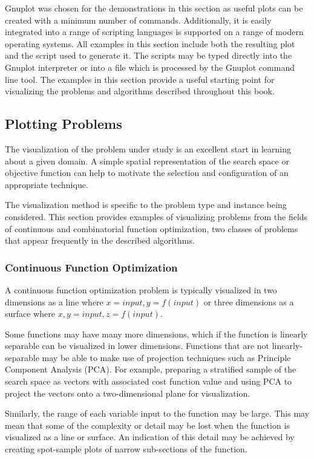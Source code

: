 Gnuplot was chosen for the demonstrations in this section as useful plots can be created with a minimum number of commands. Additionally, it is easily integrated into a range of scripting languages is supported on a range of modern operating systems. 
All examples in this section include both the resulting plot and the script used to generate it. The scripts may be typed directly into the Gnuplot interpreter or into a file which is processed by the Gnuplot command line tool. The examples in this section provide a useful starting point for visualizing the problems and algorithms described throughout this book.

%
%
\subsection{Plotting Problems}
The visualization of the problem under study is an excellent start in learning about a given domain. A simple spatial representation of the search space or objective function can help to motivate the selection and configuration of an appropriate technique. 

The visualization method is specific to the problem type and instance being considered. 
This section provides examples of visualizing problems from the fields of continuous and combinatorial function optimization, two classes of problems that appear frequently in the described algorithms.

\subsubsection{Continuous Function Optimization}
A continuous function optimization problem is typically visualized in two dimensions as a line where $x=input, y=f(input)$ or three dimensions as a surface where $x,y=input, z=f(input)$. 

Some functions may have many more dimensions, which if the function is linearly separable can be visualized in lower dimensions. Functions that are not linearly-separable may be able to make use of projection techniques such as Principle Component Analysis (PCA). For example, preparing a stratified sample of the search space as vectors with associated cost function value and using PCA to project the vectors onto a two-dimensional plane for visualization.

Similarly, the range of each variable input to the function may be large. This may mean that some of the complexity or detail may be lost when the function is visualized as a line or surface. An indication of this detail may be achieved by creating spot-sample plots of narrow sub-sections of the function. 

